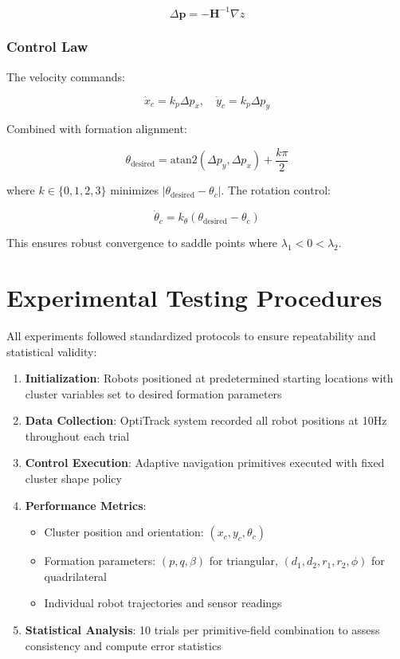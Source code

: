 \documentclass{article}
\begin{document}
\begin{equation}
\Delta \mathbf{p} = -\mathbf{H}^{-1}\nabla z
\end{equation}

\subsubsection{Control Law}

The velocity commands:

\begin{equation}
\dot{x}_c = k_p \Delta p_x, \quad \dot{y}_c = k_p \Delta p_y
\end{equation}

Combined with formation alignment:

\begin{equation}
\theta_{\text{desired}} = \text{atan2}(\Delta p_y, \Delta p_x) + \frac{k\pi}{2}
\end{equation}

where $k \in \{0,1,2,3\}$ minimizes $|\theta_{\text{desired}} - \theta_c|$. The rotation control:

\begin{equation}
\dot{\theta}_c = k_\theta(\theta_{\text{desired}} - \theta_c)
\end{equation}

This ensures robust convergence to saddle points where $\lambda_1 < 0 < \lambda_2$.

\section{Experimental Testing Procedures}

All experiments followed standardized protocols to ensure repeatability and statistical validity:

\begin{enumerate}
\item \textbf{Initialization}: Robots positioned at predetermined starting locations with cluster variables set to desired formation parameters

\item \textbf{Data Collection}: OptiTrack system recorded all robot positions at 10Hz throughout each trial

\item \textbf{Control Execution}: Adaptive navigation primitives executed with fixed cluster shape policy

\item \textbf{Performance Metrics}: 
   \begin{itemize}
   \item Cluster position and orientation: $(x_c, y_c, \theta_c)$
   \item Formation parameters: $(p, q, \beta)$ for triangular, $(d_1, d_2, r_1, r_2, \phi)$ for quadrilateral
   \item Individual robot trajectories and sensor readings
   \end{itemize}

\item \textbf{Statistical Analysis}: 10 trials per primitive-field combination to assess consistency and compute error statistics
\end{enumerate}
\end{document}
